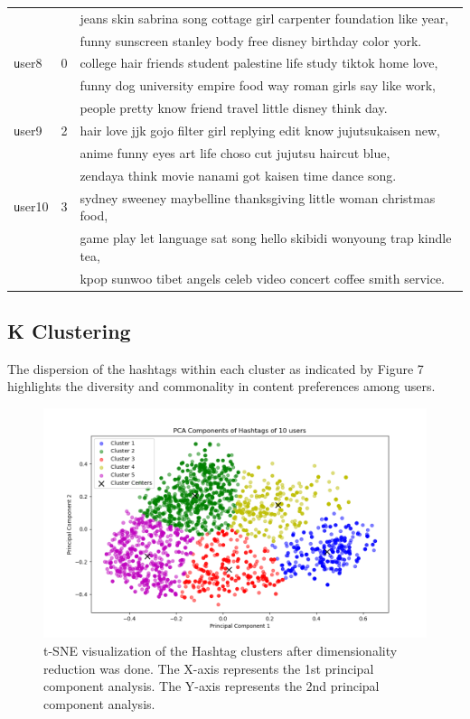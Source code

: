 \documentclass[acmtog]{acmart}
\begin{document}
\begin{table}[ht]
\begin{tabular}{lcl}
    \texttt && jeans skin sabrina song cottage girl carpenter foundation like year, \\
    \texttt && funny sunscreen stanley body free disney birthday color york. \\
    \texttt user8 & 0 & college hair friends student palestine life study tiktok home love, \\
    \texttt && funny dog university empire food way roman girls say like work, \\
    \texttt && people pretty know friend travel little disney think day. \\
    \texttt user9 & 2 & hair love jjk gojo filter girl replying edit know jujutsukaisen new, \\
    \texttt && anime funny eyes art life choso cut jujutsu haircut blue, \\
    \texttt && zendaya think movie nanami got kaisen time dance song. \\
    \texttt user10 & 3 & sydney sweeney maybelline thanksgiving little woman christmas food, \\
    \texttt && game play let language sat song hello skibidi wonyoung trap kindle tea, \\
    \texttt && kpop sunwoo tibet angels celeb video concert coffee smith service. \\
    \bottomrule
  \end{tabular}
\end{table}

\subsection{K Clustering }
The dispersion of the hashtags within each cluster as indicated by Figure 7 highlights the diversity and commonality in content preferences among users. 

\begin{figure}[ht]
  \centering
  \includegraphics[width=\linewidth]{PCA.png} 
  \caption{t-SNE visualization of the Hashtag clusters after dimensionality reduction was done. The X-axis represents the 1st principal component analysis. The Y-axis represents the 2nd principal component analysis.}
  \label{PCA Visualization of Hashtags with Clusters.}
\end{figure}
\end{document}
